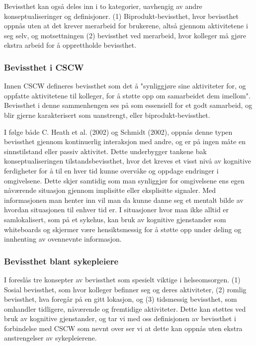 \noindent
Bevissthet kan også deles inn i to kategorier, uavhengig av andre konseptualiseringer og definisjoner. (1) Biprodukt-bevissthet, hvor bevissthet oppnås uten at det krever merarbeid for brukerene, altså gjennom aktivitetene i seg selv, og motsettningen (2) bevissthet ved merarbeid, hvor kolleger må gjøre ekstra arbeid for å opprettholde bevissthet\cite{Randell}. 


\subsubsection{Bevissthet i CSCW}
Innen CSCW defineres bevissthet som det å "synliggjøre sine aktiviteter for, og oppfatte aktivitetene til kolleger, for å støtte opp om samarbeidet dem imellom". Bevissthet i denne sammenhengen ses på som essensiell for et godt samarbeid, og blir gjerne karakterisert som uanstrengt, eller biprodukt-bevissthet\cite{Randell}. 

\noindent
I følge både C. Heath et al. (2002) og Schmidt (2002), oppnås denne typen bevissthet gjennom kontinuerlig interaksjon med andre, og er på ingen måte en sinnstilstand eller passiv aktivitet. Dette underbygger tankene bak konseptualiseringen tilstandsbevissthet, hvor det kreves et visst nivå av kognitive ferdigheter for å til en hver tid kunne overvåke og oppdage endringer i omgivelsene. Dette skjer samtidig som man synliggjør for omgivelsene ens egen nåværende situasjon gjennom implisitte eller eksplisitte signaler. Med informasjonen man henter inn vil man da kunne danne seg et mentalt bilde av hvordan situasjonen til enhver tid er. I situasjoner hvor man ikke alltid er samlokalisert, som på et sykehus, kan bruk av kognitive gjenstander som whiteboards og skjermer være hensiktsmessig for å støtte opp under deling og innhenting av ovennevnte informasjon\cite{Bardram04}. 

\subsubsection{Bevissthet blant sykepleiere}
I \cite{Randell} foreslås tre konsepter av bevissthet som spesielt viktige i helseomsorgen. (1) Sosial bevissthet, som hvor kolleger befinner seg og deres aktiviteter, (2) romlig bevissthet, hva foregår på en gitt lokasjon, og (3) tidsmessig bevissthet, som omhandler tidligere, nåværende og fremtidige aktiviteter. 
Dette kan støttes ved bruk av kognitive gjenstander, og tar vi med oss definisjonen av bevissthet i forbindelse med CSCW som nevnt over ser vi at dette kan oppnås uten ekstra anstrengelser av sykepleierene.

